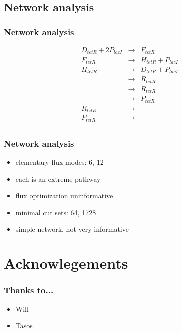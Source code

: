 \documentclass{beamer}
\begin{document}
\subsection{Network analysis}
\begin{frame}
  \frametitle{Network analysis}

\begin{eqnarray*}
D_{tetR} + 2 P_{lacI} &\rightarrow& F_{tetR} \\
             F_{tetR} &\rightarrow& H_{tetR} + P_{lacI} \\
             H_{tetR} &\rightarrow& D_{tetR} + P_{lacI} \\
                      &\rightarrow& R_{tetR} \\
                      &\rightarrow& R_{tetR} \\
                      &\rightarrow& P_{tetR} \\
             R_{tetR} &\rightarrow& \\
             P_{tetR} &\rightarrow& \\
\end{eqnarray*}

\end{frame}
\begin{frame}
  \frametitle{Network analysis}
  \begin{itemize}
    \item<1-> elementary flux modes: 6, 12
    \item<2-> each is an extreme pathway
    \item<3-> flux optimization uninformative
    \item<4-> minimal cut sets: 64, 1728
    \item<5-> simple network, not very informative
  \end{itemize}
\end{frame}

\section{Acknowlegements}
\begin{frame}
  \frametitle{Thanks to...}
  \begin{itemize}
    \item Will
    \item Tasos
  \end{itemize}  
\end{frame}
\end{document}
